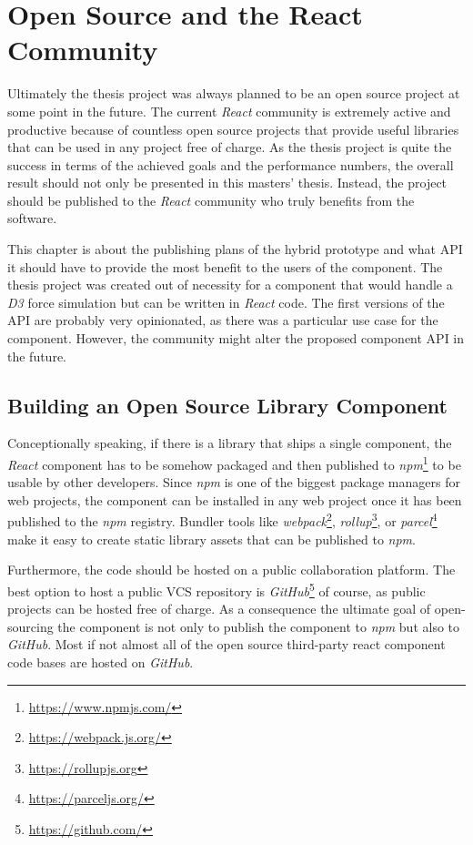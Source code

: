 \chapter{Open Source and the React Community}
\label{cha:opensource}

Ultimately the thesis project was always planned to be an open source project at some point in the future. The current \emph{React} community is extremely active and productive because of countless open source projects that provide useful libraries that can be used in any project free of charge. As the thesis project is quite the success in terms of the achieved goals and the performance numbers, the overall result should not only be presented in this masters' thesis. Instead, the project should be published to the \emph{React} community who truly benefits from the software.

This chapter is about the publishing plans of the hybrid prototype and what API it should have to provide the most benefit to the users of the component. The thesis project was created out of necessity for a component that would handle a \emph{D3} force simulation but can be written in \emph{React} code. The first versions of the API are probably very opinionated, as there was a particular use case for the component. However, the community might alter the proposed component API in the future.

\section{Building an Open Source Library Component}

Conceptionally speaking, if there is a library that ships a single component, the \emph{React} component has to be somehow packaged and then published to \emph{npm}\footnote{\url{https://www.npmjs.com/}} to be usable by other developers. Since \emph{npm} is one of the biggest package managers for web projects, the component can be installed in any web project once it has been published to the \emph{npm} registry. Bundler tools like \emph{webpack}\footnote{\url{https://webpack.js.org/}}, \emph{rollup}\footnote{\url{https://rollupjs.org}}, or \emph{parcel}\footnote{\url{https://parceljs.org/}} make it easy to create static library assets that can be published to \emph{npm}.

Furthermore, the code should be hosted on a public collaboration platform. The best option to host a public VCS repository is \emph{GitHub}\footnote{\url{https://github.com/}} of course, as public projects can be hosted free of charge. As a consequence the ultimate goal of open-sourcing the component is not only to publish the component to \emph{npm} but also to \emph{GitHub}. Most if not almost all of the open source third-party react component code bases are hosted on \emph{GitHub}.

